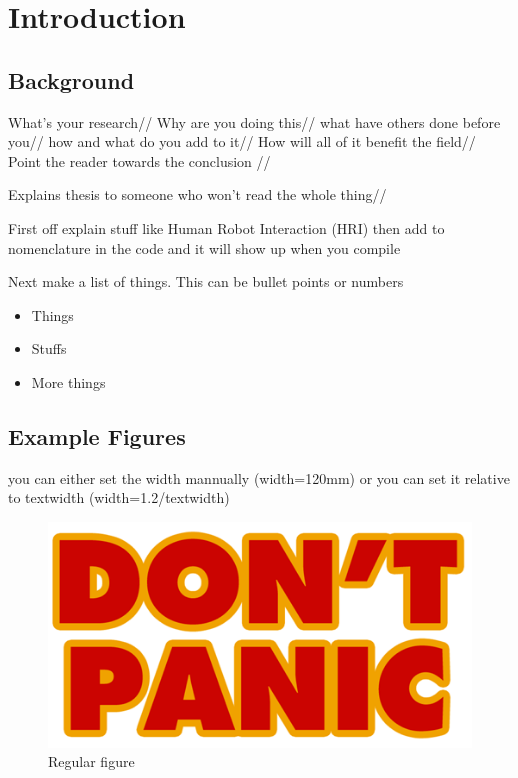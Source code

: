 
\chapter{Introduction}


\section{Background}\label{ref:background}
What's your research//
Why are you doing this//
what have others done before you//
how and what do you add to it//
How will all of it benefit the field//
Point the reader towards the conclusion //

Explains thesis to someone who won't read the whole thing//

First off explain stuff like Human Robot Interaction (HRI) then add to nomenclature in the code and it will show up when you compile


Next make a list of things. This can be bullet points or numbers

\begin{itemize}
	\item[] Things
	\item[] Stuffs
	\item[] More things
\end{itemize}

\section{Example Figures}

you can either set the width mannually (width=120mm) or you can set it relative to textwidth (width=1.2/textwidth)

\begin{figure} [ht]
	\centering    
	\includegraphics[width=120mm]{Chapter1/Figs/subfolder/dont-panic.png}
	\caption[Regular figure]{Regular figure}
	\label{fig:Scope}
\end{figure}

